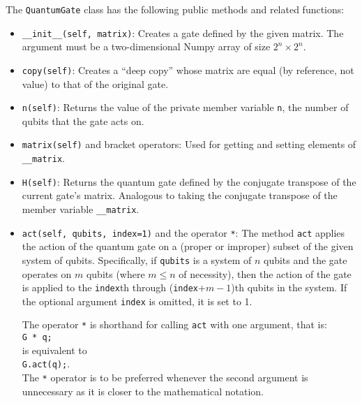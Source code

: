 \documentclass{article}
\begin{document}
The \verb~QuantumGate~ class has the following public methods and related functions: 
\begin{itemize}
\item \verb~__init__(self, matrix)~: Creates a gate defined by the given matrix. The argument must be a two-dimensional Numpy array of size $2^n \times 2^n$. 

\item \verb~copy(self)~: Creates a ``deep copy'' whose matrix are equal (by reference, not value) to that of the original gate. 

\item \verb~n(self)~: Returns the value of the private member variable \verb~n~, the number of qubits that the gate acts on.

\item \verb~matrix(self)~ and bracket operators: Used for getting and setting elements of \verb~__matrix~. 

\item \verb~H(self)~: Returns the quantum gate defined by the conjugate transpose of the current gate's matrix. Analogous to taking the conjugate transpose of the member variable \verb~__matrix~. 

\item \verb~act(self, qubits, index=1)~ and the operator \verb~*~: The method \verb~act~ applies the action of the quantum gate on a (proper or improper) subset of the given system of qubits. Specifically, if \verb~qubits~ is a system of $n$ qubits and the gate operates on $m$ qubits (where $m \le n$ of necessity), then the action of the gate is applied to the \verb~index~th through (\verb~index~$ + m - 1$)th qubits in the system. If the optional argument \verb~index~ is omitted, it is set to 1.

The operator \verb~*~ is shorthand for calling \verb~act~ with one argument, that is: \\ 
\hspace*{1em} \verb~G * q;~ \\ 
is equivalent to \\
\hspace*{1em} \verb~G.act(q);~. \\ 
The \verb~*~ operator is to be preferred whenever the second argument is unnecessary as it is closer to the mathematical notation.  


\end{itemize}
\end{document}
